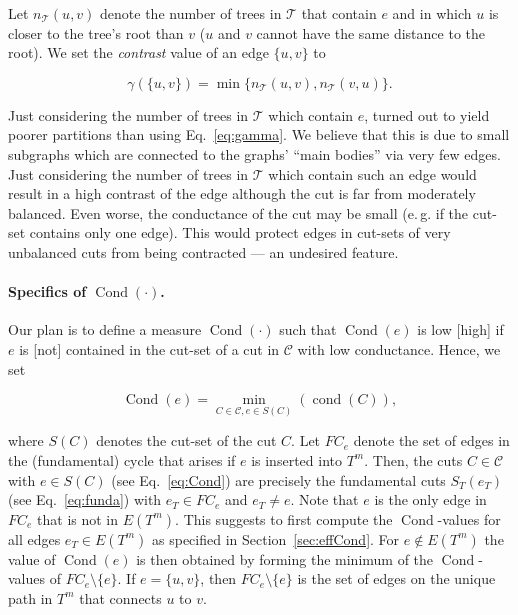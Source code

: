 \documentclass[pdftex]{llncs}
\newcommand{\eg}{e.\,g.\xspace}
\newcommand{\cond}{\operatorname{cond}}
\newcommand{\Cond}{\operatorname{Cond}}
\numberwithin{equation}{section}
\numberwithin{example}{section}
\numberwithin{table}{section}
\begin{document}
Let $n_{\mathcal{T}}(u, v)$ denote the number of trees in
$\mathcal{T}$ that contain $e$ and in which $u$ is closer to the
tree's root than $v$ ($u$ and $v$ cannot have the same distance to the
root). We set the {\em contrast} value of an edge $\{u, v\}$ to

\begin{equation}
\label{eq:gamma}
\gamma(\{u,v\}) = \min\{n_{\mathcal{T}}(u, v), n_{\mathcal{T}}(v, u)\}.
\end{equation}

Just considering the number of trees in $\mathcal{T}$ which contain
$e$, turned out to yield poorer partitions than using
Eq.~\ref{eq:gamma}. We believe that this is due to small subgraphs
which are connected to the graphs' ``main bodies'' via very few
edges. Just considering the number of trees in $\mathcal{T}$ which
contain such an edge would result in a high contrast of the edge
although the cut is far from moderately balanced. Even worse, the
conductance of the cut may be small (\eg if the cut-set contains only
one edge). This would protect edges in cut-sets of very unbalanced
cuts from being contracted --- an undesired feature.

\paragraph{Specifics of $\Cond(\cdot)$.}
Our plan is to define a measure $\Cond(\cdot)$ such that $\Cond(e)$ is
low [high] if $e$ is [not] contained in the cut-set of a cut in
$\mathcal{C}$ with low conductance. Hence, we set

\begin{equation}
\label{eq:Cond}
\Cond(e) = \min_{C \in \mathcal{C}, e \in S(C)}(\cond(C)), \end{equation}

\noindent where $S(C)$ denotes the cut-set of the cut $C$. Let $FC_e$
denote the set of edges in the (fundamental) cycle that arises if $e$
is inserted into $T^m$. Then, the cuts $C \in \mathcal{C}$ with $e \in
S(C)$ (see Eq.~\ref{eq:Cond}) are precisely the fundamental cuts
$S_T(e_T)$ (see Eq.~\ref{eq:funda}) with $e_T \in FC_e$ and $e_T \neq
e$. Note that $e$ is the only edge in $FC_e$ that is not in
$E(T^m)$. This suggests to first compute the $\Cond$-values for all
edges $e_T \in E(T^m)$ as specified in Section~\ref{sec:effCond}.  For
$e \notin E(T^m)$ the value of $\Cond(e)$ is then obtained by forming
the minimum of the $\Cond$-values of $FC_e \setminus \{e\}$. If $e =
\{u, v\}$, then $FC_e \setminus \{e\}$ is the set of edges on the
unique path in $T^m$ that connects $u$ to $v$.
\end{document}
